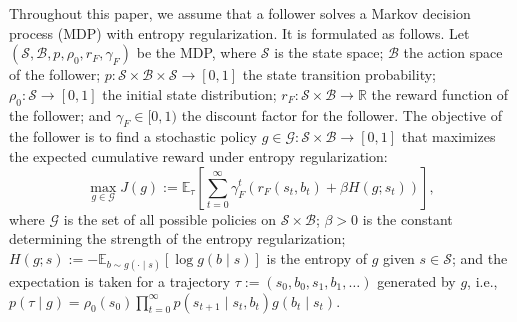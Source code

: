 \documentclass[letterpaper]{article} %
\providecommand{\R}{\mathbb{R}} %
\providecommand{\E}{\mathbb{E}} %
\begin{document}
Throughout this paper, we assume that a follower solves a Markov decision process (MDP) with entropy regularization. It is formulated as follows. Let $(\mathcal{S}, \mathcal{B}, p, \rho_0, r_F, \gamma_F)$ be the MDP, where  $\mathcal{S}$ is the state space; $\mathcal{B}$ the action space of the follower; $p: \mathcal{S}\times\mathcal{B}\times\mathcal{S}\to[0,1]$ the state transition probability; $\rho_0: \mathcal{S}\to[0,1]$ the initial state distribution; $r_F:\mathcal{S}\times\mathcal{B}\to\R$ the reward function of the follower; and $\gamma_F\in[0,1)$ the discount factor for the follower. 
The objective of the follower is to find a stochastic policy $g\in\mathcal{G}: \mathcal{S} \times\mathcal{B}\to[0,1]$ that maximizes the expected cumulative reward under entropy regularization:
\begin{equation}
    \max_{g \in \mathcal{G}} J(g) := 
    \E_{\tau}\left[ \sum_{t=0}^\infty \gamma_F^t \left(r_F(s_t, b_t) + \beta H(g;s_t)\right)\right],
    \label{eq:lower}
\end{equation}%
where $\mathcal{G}$ is the set of all possible policies on $\mathcal{S} \times \mathcal{B}$; $\beta > 0$ is the constant determining the strength of the entropy regularization; $H(g; s) := -\E_{b \sim g(\cdot \mid s)}[\log g(b \mid s)]$ is the entropy of $g$ given $s \in \mathcal{S}$; and the expectation is taken for a trajectory $\tau := (s_0, b_0, s_1, b_1, \dots)$ generated by $g$, i.e., $p(\tau\mid g) = \rho_0(s_0) \prod_{t=0}^{\infty} p(s_{t+1} \mid s_{t}, b_{t}) g(b_{t}\mid s_{t})$.
\end{document}
